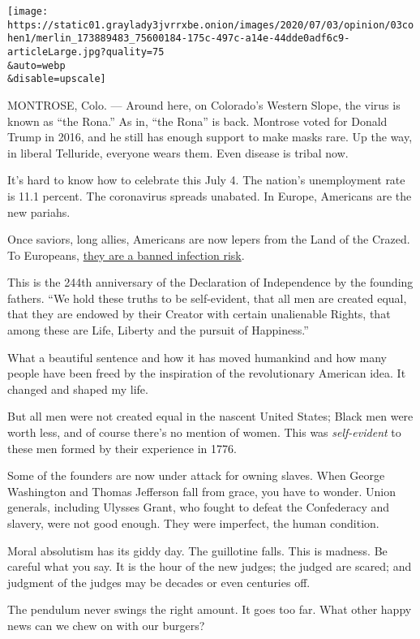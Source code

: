\texttt{[image: https://static01.graylady3jvrrxbe.onion/images/2020/07/03/opinion/03cohen1/merlin\_173889483\_75600184-175c-497c-a14e-44dde0adf6c9-articleLarge.jpg?quality=75\\\&auto=webp\\\&disable=upscale]}

MONTROSE, Colo. --- Around here, on Colorado's Western Slope, the virus
is known as ``the Rona.'' As in, ``the Rona'' is back. Montrose voted
for Donald Trump in 2016, and he still has enough support to make masks
rare. Up the way, in liberal Telluride, everyone wears them. Even
disease is tribal now.

It's hard to know how to celebrate this July 4. The nation's
unemployment rate is 11.1 percent. The coronavirus spreads unabated. In
Europe, Americans are the new pariahs.

Once saviors, long allies, Americans are now lepers from the Land of the
Crazed. To Europeans,
\href{https://www.nytimes3xbfgragh.onion/2020/06/26/world/europe/europe-us-travel-ban.html}{they
are a banned infection risk}.

This is the 244th anniversary of the Declaration of Independence by the
founding fathers. ``We hold these truths to be self-evident, that all
men are created equal, that they are endowed by their Creator with
certain unalienable Rights, that among these are Life, Liberty and the
pursuit of Happiness.''

What a beautiful sentence and how it has moved humankind and how many
people have been freed by the inspiration of the revolutionary American
idea. It changed and shaped my life.

But all men were not created equal in the nascent United States; Black
men were worth less, and of course there's no mention of women. This was
\emph{self-evident} to these men formed by their experience in 1776.

Some of the founders are now under attack for owning slaves. When George
Washington and Thomas Jefferson fall from grace, you have to wonder.
Union generals, including Ulysses Grant, who fought to defeat the
Confederacy and slavery, were not good enough. They were imperfect, the
human condition.

Moral absolutism has its giddy day. The guillotine falls. This is
madness. Be careful what you say. It is the hour of the new judges; the
judged are scared; and judgment of the judges may be decades or even
centuries off.

The pendulum never swings the right amount. It goes too far. What other
happy news can we chew on with our burgers?

